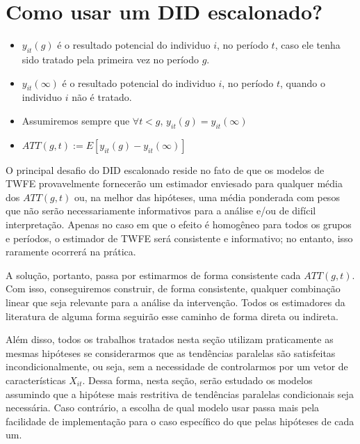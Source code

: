 \documentclass[portugues]{article}
\begin{document}
\section{Como usar um DID escalonado?}

\begin{boxrelembrando}

\begin{itemize}
    \item $y_{it}(g)$ é o resultado potencial do individuo $i$, no período $t$, caso ele tenha sido tratado pela primeira vez no período $g$. 
    \item $y_{it}(\infty)$ é o resultado potencial do individuo $i$, no período $t$, quando o individuo $i$ não é tratado. 
    \item Assumiremos sempre que $\forall t < g$, $y_{it}(g) = y_{it}(\infty)$
    \item $ATT(g,t) := E[y_{it}(g) - y_{it}(\infty)]$
\end{itemize}

\end{boxrelembrando}

O principal desafio do DID escalonado reside no fato de que os modelos de TWFE provavelmente fornecerão um estimador enviesado para qualquer média dos $ATT(g,t)$ ou, na melhor das hipóteses, uma média ponderada com pesos que não serão necessariamente informativos para a análise e/ou de difícil interpretação. Apenas no caso em que o efeito é homogêneo para todos os grupos e períodos, o estimador de TWFE será consistente e informativo; no entanto, isso raramente ocorrerá na prática. 

A solução, portanto, passa por estimarmos de forma consistente cada $ATT(g,t)$. Com isso, conseguiremos construir, de forma consistente, qualquer combinação linear que seja relevante para a análise da intervenção. Todos os estimadores da literatura de alguma forma seguirão esse caminho de forma direta ou indireta. 

Além disso, todos os trabalhos tratados nesta seção utilizam praticamente as mesmas hipóteses se considerarmos que as tendências paralelas são satisfeitas incondicionalmente, ou seja, sem a necessidade de controlarmos por um vetor de características $X_{it}$. Dessa forma, nesta seção, serão estudado os modelos assumindo que a hipótese mais restritiva de tendências paralelas condicionais seja necessária. Caso contrário, a escolha de qual modelo usar passa mais pela facilidade de implementação para o caso específico do que pelas hipóteses de cada um.
\end{document}
